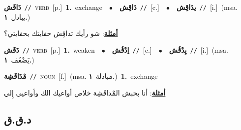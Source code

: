 \documentclass[10pt,a4paper,twoside]{article} %
\begin{document}
\begin{multicols}{2}
{\setlength\topsep{0pt}\textbf{\foreignlanguage{arabic}{دَاقَش}}\ {\color{gray}\texttt{//}\color{black}}\ \textsc{verb}\ [p.]\ \textbf{1.}~exchange\ \ $\bullet$\ \ \setlength\topsep{0pt}\textbf{\foreignlanguage{arabic}{دَاقِش}}\ {\color{gray}\texttt{//}\color{black}}\ [c.]\ \ $\bullet$\ \ \setlength\topsep{0pt}\textbf{\foreignlanguage{arabic}{يدَاقِش}}\ {\color{gray}\texttt{//}\color{black}}\ [i.]\ \color{gray}(msa. \foreignlanguage{arabic}{يبادل}~\foreignlanguage{arabic}{\textbf{١.}})\color{black}\  \begin{flushright}\color{gray}\foreignlanguage{arabic}{\textbf{\underline{\foreignlanguage{arabic}{أمثلة}}}: شو رأيك تداقِش حفايتك بحفايتي؟}\end{flushright}\color{black}} \vspace{2mm}

{\setlength\topsep{0pt}\textbf{\foreignlanguage{arabic}{دَقَش}}\ {\color{gray}\texttt{//}\color{black}}\ \textsc{verb}\ [p.]\ \textbf{1.}~weaken\ \ $\bullet$\ \ \setlength\topsep{0pt}\textbf{\foreignlanguage{arabic}{اِدْقُش}}\ {\color{gray}\texttt{//}\color{black}}\ [c.]\ \ $\bullet$\ \ \setlength\topsep{0pt}\textbf{\foreignlanguage{arabic}{يِدْقُش}}\ {\color{gray}\texttt{//}\color{black}}\ [i.]\ \color{gray}(msa. \foreignlanguage{arabic}{يَضْعُف}~\foreignlanguage{arabic}{\textbf{١.}})\color{black}\ } \vspace{2mm}

{\setlength\topsep{0pt}\textbf{\foreignlanguage{arabic}{مْدَاقَشِة}}\ {\color{gray}\texttt{//}\color{black}}\ \textsc{noun}\ [f.]\ \color{gray}(msa. \foreignlanguage{arabic}{مبادلة}~\foreignlanguage{arabic}{\textbf{١.}})\color{black}\ \textbf{1.}~exchange\  \begin{flushright}\color{gray}\foreignlanguage{arabic}{\textbf{\underline{\foreignlanguage{arabic}{أمثلة}}}: أنا بحبش المْداقَشِة خلاص أواعيك الك وأواعيي إِلي}\end{flushright}\color{black}} \vspace{2mm}

\vspace{-3mm}
\subsection*{\color{blue}\foreignlanguage{arabic}{د.ق.ق}\color{blue}{}} 


\end{multicols}
\end{document}
